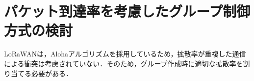 \section{パケット到達率を考慮したグループ制御方式の検討}
LoRaWANは，Alohaアルゴリズムを採用しているため，拡散率が重複した通信による衝突は考慮されていない．そのため，グループ作成時に適切な拡散率を割り当てる必要がある．